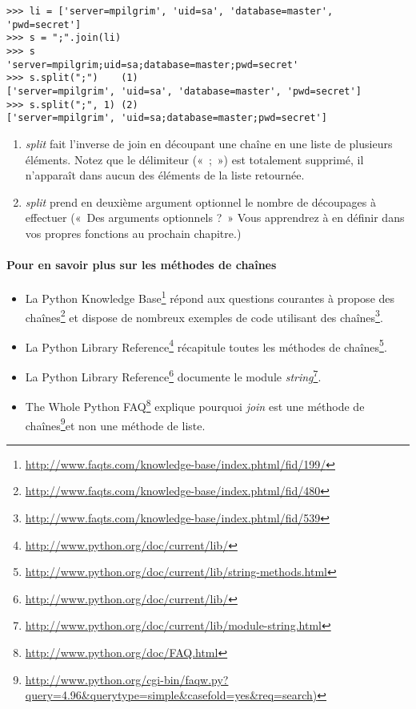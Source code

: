 \begin{example}
\begin{lstlisting}
>>> li = ['server=mpilgrim', 'uid=sa', 'database=master', 'pwd=secret']
>>> s = ";".join(li)
>>> s
'server=mpilgrim;uid=sa;database=master;pwd=secret'
>>> s.split(";")    (1)
['server=mpilgrim', 'uid=sa', 'database=master', 'pwd=secret']
>>> s.split(";", 1) (2)
['server=mpilgrim', 'uid=sa;database=master;pwd=secret']
\end{lstlisting}
\end{example}

\begin{enumerate}
\item \emph{split} fait l'inverse de join en découpant une chaîne en une liste de
    plusieurs éléments. Notez que le délimiteur («~;~») est totalement
    supprimé, il n'apparaît dans aucun des éléments de la liste retournée.
\item \emph{split} prend en deuxième argument optionnel le nombre de découpages à
    effectuer («~Des arguments optionnels ?~» Vous apprendrez à en définir dans
    vos propres fonctions au prochain chapitre.)
\end{enumerate}


\paragraph{Pour en savoir plus sur les méthodes de chaînes}
\begin{itemize}
\item{La Python Knowledge Base\footnote{\url{http://www.faqts.com/knowledge-base/index.phtml/fid/199/}} répond aux questions courantes à propose des chaînes\footnote{\url{http://www.faqts.com/knowledge-base/index.phtml/fid/480}} et dispose de nombreux exemples de code utilisant des chaînes\footnote{\url{http://www.faqts.com/knowledge-base/index.phtml/fid/539}}.}
\item{La Python Library Reference\footnote{\url{http://www.python.org/doc/current/lib/}} récapitule toutes les méthodes de chaînes\footnote{\url{http://www.python.org/doc/current/lib/string-methods.html}}.}
\item{La Python Library Reference\footnote{\url{http://www.python.org/doc/current/lib/}} documente le module \emph{string}\footnote{\url{http://www.python.org/doc/current/lib/module-string.html}}.}
\item{The Whole Python FAQ\footnote{\url{http://www.python.org/doc/FAQ.html}} explique pourquoi \emph{join} est une méthode de chaînes\footnote{\url{http://www.python.org/cgi-bin/faqw.py?query=4.96&querytype=simple&casefold=yes&req=search)}}et non une méthode de liste.}
\end{itemize}

